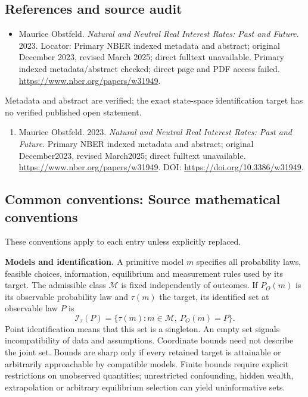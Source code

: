 \documentclass[11pt,a4paper]{article}
\begin{document}
\subsection*{References and source audit}
\begin{itemize}
\item Maurice Obstfeld. \emph{Natural and Neutral Real Interest Rates: Past and Future}. 2023. Locator: Primary NBER indexed metadata and abstract; original December 2023, revised March 2025; direct fulltext unavailable. Primary indexed metadata/abstract checked; direct page and PDF access failed. \url{https://www.nber.org/papers/w31949}.
\end{itemize}
Metadata and abstract are verified; the exact state-space identification target has no verified published open statement.
\begin{enumerate}\raggedright
\item\hypertarget{definitions:source:30007526:1}{} Maurice Obstfeld. 2023. \emph{Natural and Neutral Real Interest Rates: Past and Future}. Primary NBER indexed metadata and abstract; original December2023, revised March2025; direct fulltext unavailable.
\url{https://www.nber.org/papers/w31949}.
DOI: \url{https://doi.org/10.3386/w31949}.
\end{enumerate}

\subsection*{Common conventions: Source mathematical conventions}

These conventions apply to each entry unless explicitly replaced.

\textbf{Models and identification.} A primitive model \(m\) specifies all probability laws, feasible choices, information, equilibrium and measurement rules used by its target. The admissible class \(\mathcal M\) is fixed independently of outcomes. If \(P_O(m)\) is its observable probability law and \(\tau(m)\) the target, its identified set at observable law \(P\) is
\[
 \mathcal I_\tau(P)=\{\tau(m):m\in\mathcal M,\ P_O(m)=P\}.
\]
Point identification means that this set is a singleton. An empty set signals incompatibility of data and assumptions. Coordinate bounds need not describe the joint set. Bounds are sharp only if every retained target is attainable or arbitrarily approachable by compatible models. Finite bounds require explicit restrictions on unobserved quantities; unrestricted confounding, hidden wealth, extrapolation or arbitrary equilibrium selection can yield uninformative sets.
\end{document}
